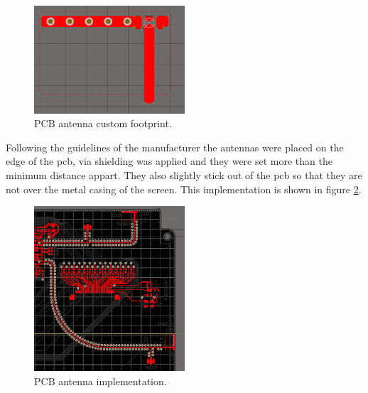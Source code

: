 \begin{figure}[!htb]
    \centering
    \includegraphics[width=0.5\textwidth,keepaspectratio]{chap/hardFig/antenna_footprint}
    \caption{PCB antenna custom footprint.}
    \label{fig:wl1835 pcb antennas}
\end{figure}

Following the guidelines of the manufacturer the antennas were placed on the edge of the pcb, via shielding was applied and they were set more than the minimum distance appart. They also slightly stick out of the pcb so that they are not over the metal casing of the screen. This implementation is shown in figure \ref{fig:pcb antennas implement}.

\begin{figure}[!htb]
    \centering
    \includegraphics[width=0.5\textwidth,keepaspectratio]{chap/hardFig/antenna_implementation}
    \caption{PCB antenna implementation.}
    \label{fig:pcb antennas implement}
\end{figure}

\clearpage

